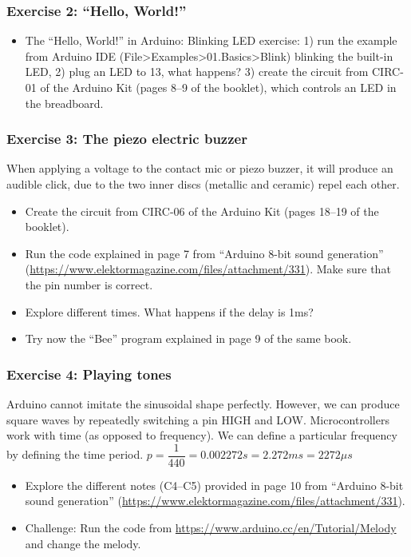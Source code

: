 \documentclass[screen, aspectratio=43]{beamer}
\begin{document}
%
\begin{frame}
  \frametitle{Exercise 2: ``Hello, World!''}
    \begin{itemize}
    	\item The ``Hello, World!'' in Arduino: Blinking LED exercise: 1) run the example from Arduino IDE (File>Examples>01.Basics>Blink) blinking the built-in LED, 2) plug an LED to 13, what happens? 3) create the circuit from CIRC-01 of the Arduino Kit (pages 8--9 of the booklet), which controls an LED in the breadboard.
    \end{itemize}
\end{frame}
%
\begin{frame}
  \frametitle{Exercise 3: The piezo electric buzzer}
  When applying a voltage to the contact mic or piezo buzzer, it will produce an audible click, due to the two inner discs (metallic and ceramic) repel each other.
    \begin{itemize}
    	\item Create the circuit from CIRC-06 of the Arduino Kit (pages 18--19 of the booklet).
	\item Run the code explained in page 7 from ``Arduino 8-bit sound generation'' (\url{https://www.elektormagazine.com/files/attachment/331}). Make sure that the pin number is correct. 
	\item Explore different times. What happens if the delay is 1ms?
	\item Try now the ``Bee'' program explained in page 9 of the same book.
    \end{itemize}
\end{frame}
%
\begin{frame}
  \frametitle{Exercise 4: Playing tones}
  Arduino cannot imitate the sinusoidal shape perfectly. However, we can produce square waves by repeatedly switching a pin HIGH and LOW. Microcontrollers work with time (as opposed to frequency). We can define a particular frequency by defining the time period.
	$p =  \dfrac{1}{440} = 0.002272 s = 2.272 ms = 2272  \mu s$
    \begin{itemize}
    	\item Explore the different notes (C4--C5) provided in page 10 from ``Arduino 8-bit sound generation'' (\url{https://www.elektormagazine.com/files/attachment/331}). 
	\item Challenge: Run the code from \url{https://www.arduino.cc/en/Tutorial/Melody} and change the melody.
    \end{itemize}
\end{frame}
\end{document}
